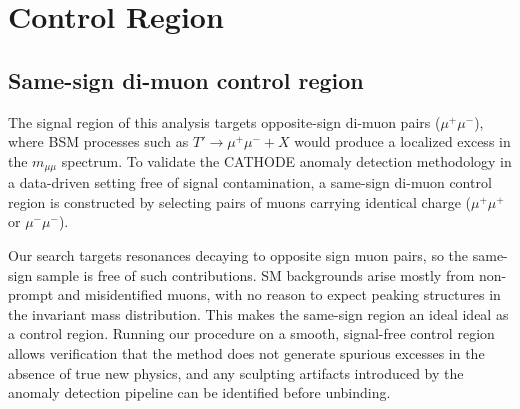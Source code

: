 \newpage
\section{Control Region}
\label{sec:control_region}
\ifboth

\subsection{Same-sign di-muon control region}
\label{sec:ss_control_region}



The signal region of this analysis targets opposite-sign di-muon pairs ($\mu^+\mu^-$), where BSM processes such as $T' \rightarrow \mu^+\mu^- + X$ would produce a localized excess in the $m_{\mu\mu}$ spectrum.
To validate the CATHODE anomaly detection methodology in a data-driven setting free of signal contamination, a same-sign di-muon control region is constructed by selecting pairs of muons carrying identical charge ($\mu^+\mu^+$ or $\mu^-\mu^-$).
 
Our search targets resonances decaying to opposite sign muon pairs, so the same-sign sample is free of such contributions.
SM backgrounds arise mostly from non-prompt and misidentified muons, with no reason to expect peaking structures in the invariant mass distribution.
This makes the same-sign region an ideal ideal as a control region.
Running our procedure on a smooth, signal-free control region allows verification that the method does not generate spurious excesses in the absence of true new physics, and any sculpting artifacts introduced by the anomaly detection pipeline can be identified before unbinding.




